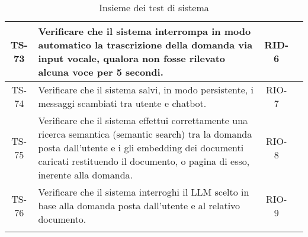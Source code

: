 \begin{xltabular}{\textwidth}{| c | X | c | c |}
    \hline
    TS-73 & Verificare che il sistema interrompa in modo automatico la trascrizione della domanda via input vocale, qualora non fosse rilevato alcuna voce per 5 secondi. & RID-6 & \textcolor{xmarkcolor}{} \\
    \hline
    TS-74 & Verificare che il sistema salvi, in modo persistente, i messaggi scambiati tra utente e chatbot. & RIO-7 & \textcolor{xmarkcolor}{} \\
    \hline
    TS-75 & Verificare che il sistema effettui correttamente una ricerca semantica (semantic search) tra la domanda posta dall'utente e i gli embedding dei documenti caricati restituendo il documento, o pagina di esso, inerente alla domanda. & RIO-8 & \textcolor{xmarkcolor}{} \\
    \hline
    TS-76 & Verificare che il sistema interroghi il LLM scelto in base alla domanda posta dall'utente e al relativo documento. & RIO-9 & \textcolor{xmarkcolor}{} \\
    \hline
     \caption{Insieme dei test di sistema}
    \label{tab:test}
\end{xltabular}
\endgroup

